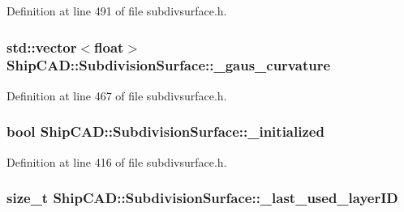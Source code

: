 Definition at line 491 of file subdivsurface.\+h.

\subsubsection[{\texorpdfstring{\+\_\+gaus\+\_\+curvature}{_gaus_curvature}}]{\setlength{\rightskip}{0pt plus 5cm}std\+::vector$<$float$>$ Ship\+C\+A\+D\+::\+Subdivision\+Surface\+::\+\_\+gaus\+\_\+curvature\hspace{0.3cm}{\ttfamily [protected]}}\hypertarget{classShipCAD_1_1SubdivisionSurface_a20cbcc689f7b2f8af21f502748521185}{}\label{classShipCAD_1_1SubdivisionSurface_a20cbcc689f7b2f8af21f502748521185}


Definition at line 467 of file subdivsurface.\+h.

\subsubsection[{\texorpdfstring{\+\_\+initialized}{_initialized}}]{\setlength{\rightskip}{0pt plus 5cm}bool Ship\+C\+A\+D\+::\+Subdivision\+Surface\+::\+\_\+initialized\hspace{0.3cm}{\ttfamily [protected]}}\hypertarget{classShipCAD_1_1SubdivisionSurface_a828f85ee49e1481e95f61b919070842c}{}\label{classShipCAD_1_1SubdivisionSurface_a828f85ee49e1481e95f61b919070842c}


Definition at line 416 of file subdivsurface.\+h.

\subsubsection[{\texorpdfstring{\+\_\+last\+\_\+used\+\_\+layer\+ID}{_last_used_layerID}}]{\setlength{\rightskip}{0pt plus 5cm}size\+\_\+t Ship\+C\+A\+D\+::\+Subdivision\+Surface\+::\+\_\+last\+\_\+used\+\_\+layer\+ID\hspace{0.3cm}{\ttfamily [protected]}}\hypertarget{classShipCAD_1_1SubdivisionSurface_a0ba5c4e08110400890eb60140f3e2058}{}\label{classShipCAD_1_1SubdivisionSurface_a0ba5c4e08110400890eb60140f3e2058}


